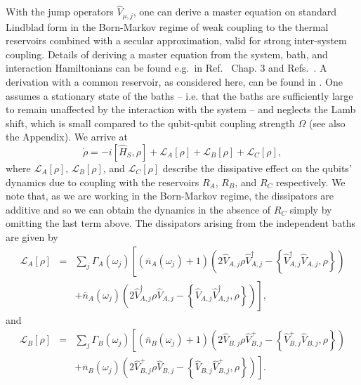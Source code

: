\documentclass[12pt]{iopart}
\begin{document}
With the jump operators $\hat{V}_{\mu,j}$, one can derive a master equation on standard Lindblad form in the Born-Markov regime of weak coupling to the thermal reservoirs combined with a secular approximation, valid for strong inter-system coupling. Details of deriving a master equation from the system, bath, and interaction Hamiltonians can be found e.g.~in Ref.~\cite{def-curr1} Chap. 3 and Refs.~\cite{Hofer2017,Rivas2010,schaller2015}. A derivation with a common reservoir, as considered here, can be found in \cite{equi7}. One assumes a stationary state of the baths -- i.e. that the baths are sufficiently large to remain unaffected by the interaction with the system -- and neglects the Lamb shift, which is small compared to the qubit-qubit coupling strength $\Omega$ \cite{def-curr1,Rivas2010,NC} (see also the Appendix). We arrive at
\begin{equation}
\label{mast}
\dot\rho=-i[\hat{H}_{S},\rho]+\mathcal{L}_{A}[\rho]+\mathcal{L}_{B}[\rho]+\mathcal{L}_{C}[\rho],
\end{equation}
where $\mathcal{L}_{A}[\rho]$, $\mathcal{L}_{B}[\rho]$, and $\mathcal{L}_{C}[\rho]$ describe the dissipative effect on the qubits' dynamics due to coupling with the reservoirs $R_{A}$, $R_{B}$, and $R_{C}$ respectively. We note that, as we are working in the Born-Markov regime, the dissipators are additive \cite{Kolodynski2017} and so we can obtain the dynamics in the absence of $R_C$ simply by omitting the last term above. The dissipators arising from the independent baths are given by
\begin{eqnarray}
\label{LA}
\mathcal{L}_{A}[\rho] &=& \sum_{j} \Gamma_{A}(\omega_{j})\left[ \left(\overline{n}_{A}(\omega_{j}) + 1\right)\left(2\hat{V}_{A,j}\rho \hat{V}_{A,j}^{\dagger} -\left\{\hat{V}_{A,j}^{\dagger}\hat{V}_{A,j},\rho\right\}\right)\right. \nonumber \\
&& \left. + \overline{n}_{A}(\omega_{j})\left(2\hat{V}_{A,j}^{\dagger} \rho \hat{V}_{A,j} - \left\{\hat{V}_{A,j}\hat{V}_{A,j}^{\dagger},\rho\right\}\right)\right] ,
\end{eqnarray}
and
\begin{eqnarray}
\label{LB}
\mathcal{L}_{B}[\rho] &=& \sum_{j} \Gamma_{B}(\omega_{j})\left[ \left(\overline{n}_{B}(\omega_{j}) + 1\right)\left(2\hat{V}_{B,j}\rho \hat{V}_{B,j}^{+} -\left\{\hat{V}_{B,j}^{+}\hat{V}_{B,j},\rho\right\}\right) \right.\nonumber \\
&&\left. + \overline{n}_{B}(\omega_{j})\left(2\hat{V}_{B,j}^{+} \rho \hat{V}_{B,j} - \left\{\hat{V}_{B,j}\hat{V}_{B,j}^{+},\rho\right\}\right)\right].
\end{eqnarray}
\end{document}
